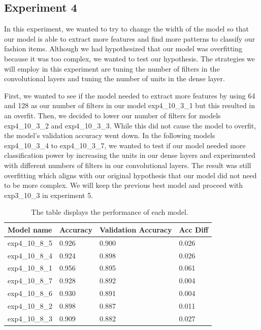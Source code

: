 \documentclass[twoside,twocolumn,9pt]{article}
\begin{document}
\subsection{Experiment 4}
In this experiment, we wanted to try to change the width of the model so that our model is able to extract more features and find more patterns to classify our fashion items. Although we had hypothesized that our model was overfitting because it was too complex, we wanted to test our hypothesis. The strategies we will employ in this experiment are tuning the number of filters in the convolutional layers and tuning the number of units in the dense layer. 

\noindent First, we wanted to see if the model needed to extract more features by using 64 and 128 as our number of filters in our model exp4\_10\_3\_1 but this resulted in an overfit. Then, we decided to lower our number of filters for models exp4\_10\_3\_2 and exp4\_10\_3\_3. While this did not cause the model to overfit, the model’s validation accuracy went down. In the following models exp4\_10\_3\_4 to exp4\_10\_3\_7, we wanted to test if our model needed more classification power by increasing the units in our dense layers and experimented with different numbers of filters in our convolutional layers. The result was still overfitting which aligns with our original hypothesis that our model did not need to be more complex. We will keep the previous best model and proceed with exp3\_10\_3 in experiment 5.

\begin{table}[h]
\small
  \caption{\ The table displays the performance of each model.}
  \label{tbl:example1}
  \begin{tabular*}{0.48\textwidth}{@{\extracolsep{\fill}}llll}
    \hline
    Model name & Accuracy & Validation Accuracy & Acc Diff\\
    \hline
    exp4\_10\_8\_5 & 0.926 & 0.900 & 0.026\\
    exp4\_10\_8\_4 & 0.924 & 0.898 & 0.026\\
    exp4\_10\_8\_1 & 0.956 & 0.895 & 0.061\\
    exp4\_10\_8\_7 & 0.928 & 0.892 & 0.004\\
    exp4\_10\_8\_6 & 0.930 & 0.891 & 0.004\\
    exp4\_10\_8\_2 & 0.898 & 0.887 & 0.011\\
    exp4\_10\_8\_3 & 0.909 & 0.882 & 0.027\\
    \hline
  \end{tabular*}
\end{table}
\end{document}
